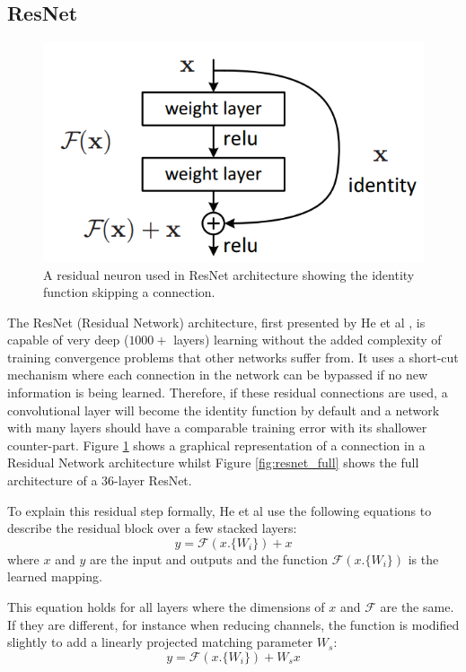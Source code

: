 \documentclass[fleqn,twoside,12pt]{report}
\begin{document}
\subsection{ResNet}
\label{sec:resnet}


\begin{figure}[h]
	\centering
	\includegraphics[width=0.7\linewidth]{residual_neuron.png}
	\caption{A residual neuron used in ResNet architecture showing the identity function skipping a connection.}
	\label{fig:residual}
\end{figure}

The ResNet (Residual Network) architecture, first presented by He et al \cite{he}, is capable of very deep ($1000+$ layers) learning without the added complexity of training convergence problems that other networks suffer from. It uses a short-cut mechanism where each connection in the network can be bypassed if no new information is being learned. Therefore, if these residual connections are used, a convolutional layer will become the identity function by default and a network with many layers should have a comparable training error with its shallower counter-part. Figure \ref{fig:residual} shows a graphical representation of a connection in a Residual Network architecture whilst Figure \ref{fig:resnet_full} shows the full architecture of a $36$-layer ResNet.


To explain this residual step formally, He et al \cite{he} use the following equations to describe the residual block over a few stacked layers:
\begin{equation}
y = \mathcal{F}(x.\{W_i\}) + x
\end{equation}
where $x$ and $y$ are the input and outputs and the function $\mathcal{F}(x.\{W_i\})$ is the learned mapping. 

This equation holds for all layers where the dimensions of $x$ and $\mathcal{F}$ are the same. If they are different, for instance when reducing channels, the function is modified slightly to add a linearly projected matching parameter $W_s$:
\begin{equation}
y = \mathcal{F}(x.\{W_i\}) + W_s x
\end{equation}
\end{document}
